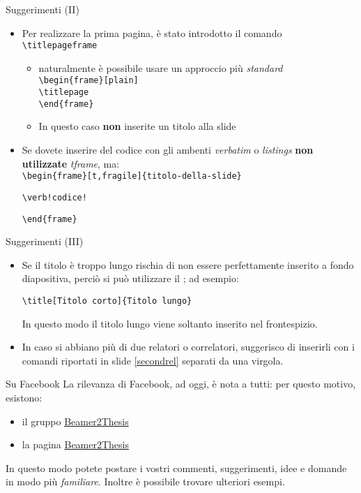 \begin{frame}[fragile]{Suggerimenti (II)}
\begin{itemize}
\item Per realizzare la prima pagina, è stato introdotto il comando \verb!\titlepageframe!
\begin{itemize}
\item naturalmente è possibile usare un approccio più \emph{standard}\\
\verb!\begin{frame}[plain]!\\
\verb!\titlepage! \\
\verb!\end{frame}!
\item In questo caso \textbf{non} inserite un titolo alla slide
\end{itemize}
\item Se dovete inserire del codice con gli ambenti \emph{verbatim} o \emph{listings} \textbf{non utilizzate} \emph{tframe}, ma:\\
\verb!\begin{frame}[t,fragile]{titolo-della-slide}!
\begin{verbatim}
\verb!codice!
\end{verbatim}
\verb!\end{frame}!
\end{itemize}
\end{frame}

\begin{frame}[t,fragile]{Suggerimenti (III)}
\begin{itemize}
\item Se il titolo è troppo lungo rischia di non essere perfettamente inserito a fondo diapositiva, perciò si può utilizzare il ; ad esempio:
\begin{verbatim}
\title[Titolo corto]{Titolo lungo}
\end{verbatim}
In questo modo il titolo lungo viene soltanto inserito nel frontespizio.
\item In caso si abbiano più di due relatori o correlatori, suggerisco di inserirli con i comandi riportati in slide \ref{secondrel} separati da una virgola.
\end{itemize}
\end{frame}

\begin{tframe}{Su Facebook}
La rilevanza di Facebook, ad oggi, è nota a tutti: per questo motivo, esistono:
\begin{itemize}
\item il gruppo \href{https://www.facebook.com/\#!/groups/beamer2thesis/}{Beamer2Thesis}
\item la pagina \href{https://www.facebook.com/\#!/pages/Beamer2Thesis/112814205489099}{Beamer2Thesis}
\end{itemize} 
In questo modo potete postare i vostri commenti, suggerimenti, idee e domande in modo più \emph{familiare}. Inoltre è possibile trovare ulteriori esempi.
\end{tframe}

